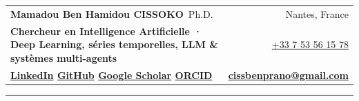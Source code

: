 \newcommand{\cvjob}[4]{%
  \noindent\textbf{#1}\hfill{\small\bfseries\textcolor{accent}{#2}}\par
  \noindent{\small\itshape\textcolor{muted}{#3}}\hfill{\small\itshape\textcolor{muted}{#4}}\par}
\newcommand{\cvproject}[3]{%
  \noindent\textbf{#1}\hfill{\small\bfseries\textcolor{accent}{#2}}\par
  \noindent{\footnotesize\textcolor{muted}{#3}}\par}
\newcommand{\cvstack}[1]{\noindent{\footnotesize\textcolor{muted}{\textbf{Stack~:}\,#1}}\par\vspace{4pt}}
\newcommand{\cvpub}[3]{%
  \noindent\hangindent=9mm\hangafter=1\makebox[9mm][l]{\small\bfseries\textcolor{accent}{[#1]}}{\small #2\if\relax\detokenize{#3}\relax\else{} \href{#3}{\textcolor{accent}{\textbf{[Lien]}}}\fi}\par\vspace{2pt}}
\newcommand{\cvdegree}[3]{%
  \noindent{\small\bfseries #1}\hfill{\small\bfseries\textcolor{accent}{#2}}\par
  \noindent{\small\itshape\textcolor{muted}{#3}}\par\vspace{3pt}}
\newcommand{\cvref}[3]{%
  \begin{minipage}[t]{0.315\linewidth}\raggedright\footnotesize
    \textbf{\small #1}\\ \textcolor{muted}{#2}\\ \href{mailto:#3}{\textcolor{accent}{#3}}
  \end{minipage}}
\newcommand{\cvskill}[2]{\textbf{#1} & #2\\[1.5pt]}


\begin{tabularx}{\linewidth}{@{}X r@{}}
  {\LARGE\bfseries Mamadou Ben Hamidou {\color{accent}CISSOKO}}\,{\large\color{muted} Ph.D.} &
  {\small Nantes, France}\\[2pt]
  {\color{accent}\bfseries\small Chercheur en Intelligence Artificielle · Deep Learning, séries temporelles, LLM \& systèmes multi-agents} &
  {\small \href{tel:+33753561578}{+33 7 53 56 15 78}}\\[1pt]
  {\small\color{accent}\bfseries
    \href{https://www.linkedin.com/in/mamadou-ben-hamidou-cissoko-2171b0166/}{LinkedIn} \quad
    \href{https://github.com/benprano}{GitHub} \quad
    \href{https://scholar.google.com/citations?user=k_2SuOkAAAAJ\&hl=en\&oi=sra}{Google Scholar} \quad
    \href{https://orcid.org/0009-0002-1840-9325}{ORCID}} &
  {\small\bfseries \href{mailto:cissbenprano@gmail.com}{cissbenprano@gmail.com}}
\end{tabularx}
{\color{accent}\rule{\linewidth}{1.2pt}}

